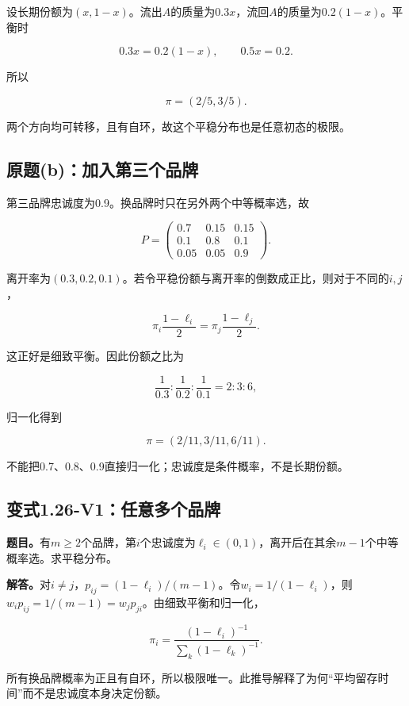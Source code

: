 \documentclass[
  11pt,
  a4paper,
  UTF8,
  fontset=fandol]{ctexart}
\begin{document}
设长期份额为\((x,1-x)\)。流出\(A\)的质量为\(0.3x\)，流回\(A\)的质量为\(0.2(1-x)\)。平衡时

\[
0.3x=0.2(1-x),\qquad 0.5x=0.2.
\]

所以

\[
\boxed{\pi=(2/5,3/5).}
\]

两个方向均可转移，且有自环，故这个平稳分布也是任意初态的极限。

\subsection{原题(b)：加入第三个品牌}\label{ux539fux9898bux52a0ux5165ux7b2cux4e09ux4e2aux54c1ux724c}

第三品牌忠诚度为0.9。换品牌时只在另外两个中等概率选，故

\[
P=\begin{pmatrix}
0.7&0.15&0.15\\
0.1&0.8&0.1\\
0.05&0.05&0.9
\end{pmatrix}.
\]

离开率为\((0.3,0.2,0.1)\)。若令平稳份额与离开率的倒数成正比，则对于不同的\(i,j\)，

\[
\pi_i\frac{1-\ell_i}{2}=\pi_j\frac{1-\ell_j}{2}.
\]

这正好是细致平衡。因此份额之比为

\[
\frac1{0.3}:\frac1{0.2}:\frac1{0.1}=2:3:6,
\]

归一化得到

\[
\boxed{\pi=(2/11,3/11,6/11).}
\]

不能把0.7、0.8、0.9直接归一化；忠诚度是条件概率，不是长期份额。

\subsection{变式1.26-V1：任意多个品牌}\label{ux53d8ux5f0f1.26-v1ux4efbux610fux591aux4e2aux54c1ux724c}

\textbf{题目。}有\(m\ge2\)个品牌，第\(i\)个忠诚度为\(\ell_i\in(0,1)\)，离开后在其余\(m-1\)个中等概率选。求平稳分布。

\textbf{解答。}对\(i\ne j\)，\(p_{ij}=(1-\ell_i)/(m-1)\)。令\(w_i=1/(1-\ell_i)\)，则\(w_ip_{ij}=1/(m-1)=w_jp_{ji}\)。由细致平衡和归一化，

\[
\boxed{\pi_i=\frac{(1-\ell_i)^{-1}}{\sum_k(1-\ell_k)^{-1}}.}
\]

所有换品牌概率为正且有自环，所以极限唯一。此推导解释了为何``平均留存时间''而不是忠诚度本身决定份额。
\end{document}
